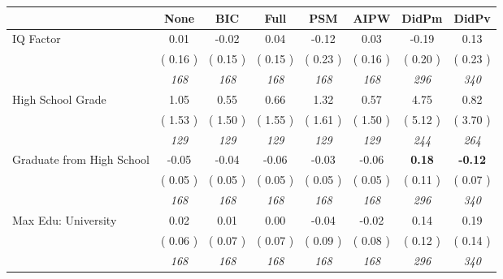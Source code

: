\begin{tabular}{l c c c c c c c}
\toprule
 & None & BIC & Full & PSM & AIPW & DidPm & DidPv \\
\midrule
IQ Factor &      0.01 &     -0.02 &      0.04 &     -0.12 &      0.03 &     -0.19 &      0.13 \\
& (     0.16 ) & (     0.15 ) & (     0.15 ) & (     0.23 ) & (     0.16 ) & (     0.20 ) & (     0.23 ) \\
& \textit{ 168 } & \textit{ 168 } & \textit{ 168 } & \textit{ 168 } & \textit{ 168 } & \textit{ 296 } & \textit{ 340 } \\
High School Grade &      1.05 &      0.55 &      0.66 &      1.32 &      0.57 &      4.75 &      0.82 \\
& (     1.53 ) & (     1.50 ) & (     1.55 ) & (     1.61 ) & (     1.50 ) & (     5.12 ) & (     3.70 ) \\
& \textit{ 129 } & \textit{ 129 } & \textit{ 129 } & \textit{ 129 } & \textit{ 129 } & \textit{ 244 } & \textit{ 264 } \\
Graduate from High School &     -0.05 &     -0.04 &     -0.06 &     -0.03 &     -0.06 & \textbf{      0.18 } & \textbf{     -0.12 } \\
& (     0.05 ) & (     0.05 ) & (     0.05 ) & (     0.05 ) & (     0.05 ) & (     0.11 ) & (     0.07 ) \\
& \textit{ 168 } & \textit{ 168 } & \textit{ 168 } & \textit{ 168 } & \textit{ 168 } & \textit{ 296 } & \textit{ 340 } \\
Max Edu: University &      0.02 &      0.01 &      0.00 &     -0.04 &     -0.02 &      0.14 &      0.19 \\
& (     0.06 ) & (     0.07 ) & (     0.07 ) & (     0.09 ) & (     0.08 ) & (     0.12 ) & (     0.14 ) \\
& \textit{ 168 } & \textit{ 168 } & \textit{ 168 } & \textit{ 168 } & \textit{ 168 } & \textit{ 296 } & \textit{ 340 } \\
\bottomrule
\end{tabular}
